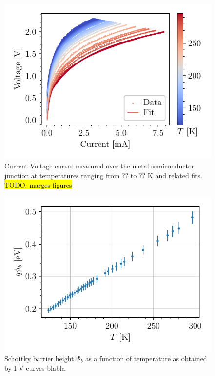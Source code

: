 \begin{figure}[htbp]
    \centering
    \includegraphics[scale=1]{figures/iv-curves.pdf}
    \caption{Current-Voltage curves measured over the metal-semiconductor junction at temperatures ranging from $??$ to $??$ K and related fits. \hl{TODO: marges figures}}
    \label{fig:iv-curves}
\end{figure}
\begin{figure}[htbp]
    \centering
    \includegraphics[scale=1]{figures/iv-schottky-potential-temperature.pdf}
    \caption{Schottky barrier height $\Phi_b$ as a function of temperature as obtained by I-V curves blabla. }
    \label{fig:iv-barrier-height}
\end{figure}
